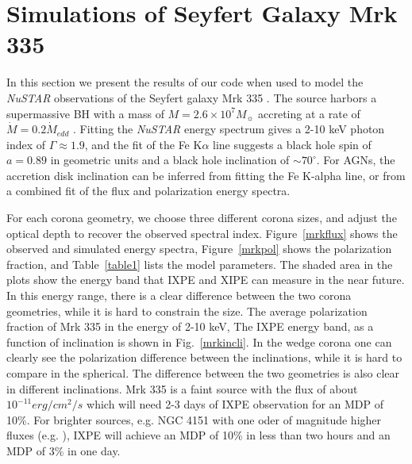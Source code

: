\documentclass[manuscript]{aastex}
\begin{document}
\section{Simulations of Seyfert  Galaxy Mrk 335} \label{dis}
In this section we present the results of our code when used to model the {\it NuSTAR} observations of the 
Seyfert  galaxy Mrk 335 \citet{kee16}. The source harbors a supermassive BH with a mass of 
$M=2.6\times10^7M_{\sun}$ accreting at a rate of $\dot{M}=0.2\dot{M}_{edd}$ \citep{wil15}. 
Fitting the {\it NuSTAR} energy spectrum gives a 2-10 keV photon index of $\Gamma\approx1.9$, and the fit
of the Fe K$\alpha$ line suggests a black hole spin of $a=0.89$ in geometric units and a black hole inclination of $\sim70^{\circ}$. For AGNs, the accretion disk inclination can be inferred from fitting the Fe K-alpha line, or from a combined fit of the flux and polarization energy spectra.

For each corona geometry, we choose three different corona sizes, and adjust the optical depth to recover 
the observed spectral index. Figure~\ref{mrkflux} shows the observed and simulated energy spectra, 
Figure~\ref{mrkpol} shows the polarization fraction, and Table~\ref{table1} lists the model parameters. 
The shaded area in the plots show the energy band that IXPE and XIPE can measure in the near future. In this energy range, there is a clear difference between the two corona geometries, while it is hard to constrain the size. The average polarization fraction of Mrk 335 in the energy of 2-10 keV, The IXPE energy band, as a function of inclination is shown in Fig.~\ref{mrkincli}. In the wedge corona one can clearly see the polarization difference between the  inclinations, while it is hard to compare  in the spherical. The difference between the two geometries is also clear in different inclinations. Mrk 335 is a faint source with the flux of about $10^{-11} erg/cm^2/s$ which will need 2-3 days of IXPE observation for an MDP of 10\%. For brighter sources, e.g. NGC 4151 with one oder of magnitude higher fluxes (e.g. \citet{mar16}), IXPE will achieve an MDP of 10\% in less than two hours and an MDP of 3\% in one day.
 
\end{document}
